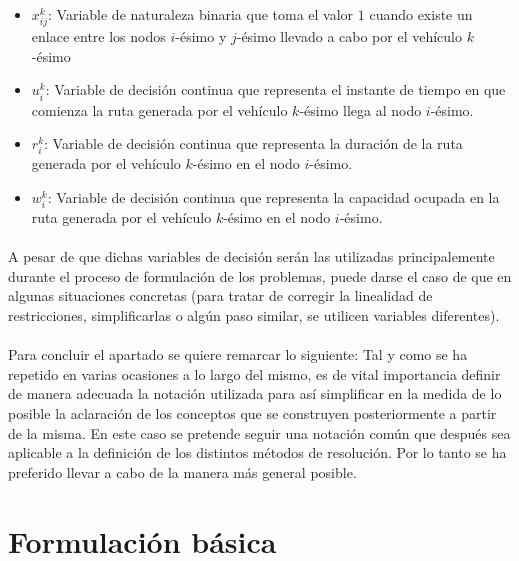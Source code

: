 \documentclass{subfiles}
\begin{document}
        \begin{itemize}
          \item $x_{ij}^{k}$: Variable de naturaleza binaria que toma el valor $1$ cuando existe un enlace entre los nodos $i$-ésimo y $j$-ésimo llevado a cabo por el vehículo $k$-ésimo
          \item $u_{i}^{k}$: Variable de decisión continua que representa el instante de tiempo en que comienza la ruta generada por el vehículo $k$-ésimo llega al nodo $i$-ésimo.
          \item $r_{i}^{k}$: Variable de decisión continua que representa la duración de la ruta generada por el vehículo $k$-ésimo en el nodo $i$-ésimo.
          \item $w_{i}^{k}$: Variable de decisión continua que representa la capacidad ocupada en la ruta generada por el vehículo $k$-ésimo en el nodo $i$-ésimo.
        \end{itemize}

        \paragraph{}
        A pesar de que dichas variables de decisión serán las utilizadas principalemente durante el proceso de formulación de los problemas, puede darse el caso de que en algunas situaciones concretas (para tratar de corregir la linealidad de restricciones, simplificarlas o algún paso similar, se utilicen variables diferentes).

      \paragraph{}
      Para concluir el apartado se quiere remarcar lo siguiente: Tal y como se ha repetido en varias ocasiones a lo largo del mismo, es de vital importancia definir de manera adecuada la notación utilizada para así simplificar en la medida de lo posible la aclaración de los conceptos que se construyen posteriormente a partir de la misma. En este caso se pretende seguir una notación común que después sea aplicable a la definición de los distintos métodos de resolución. Por lo tanto se ha preferido llevar a cabo de la manera más general posible.

    \section{Formulación básica}
    \label{sec:formulation_basic_formulation}
\end{document}

